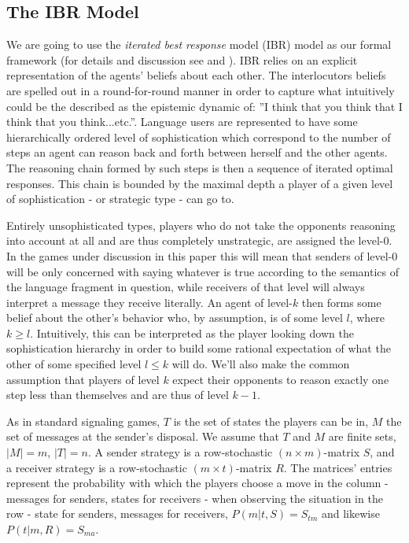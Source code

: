 \documentclass[10pt]{article}
\begin{document}
\subsection{The IBR Model}
We are going to use the \textit{iterated best response} model (IBR) model as our formal framework (for details and discussion see \cite{franke2009signal} and \cite{franke2014pragmatic}). IBR relies on an explicit representation of the agents' beliefs about each other. The interlocutors beliefs are spelled out in a round-for-round manner in order to capture what intuitively could be the described as the epistemic dynamic of: ''I think that you think that I think that you think...etc.''. Language users are represented to have some hierarchically ordered level of sophistication which correspond to the number of steps an agent can reason back and forth between herself and the other agents. The reasoning chain formed by such steps is then a sequence of iterated optimal responses. This chain is bounded by the maximal depth a player of a given level of sophistication - or strategic type - can go to.

Entirely unsophisticated types, players who do not take the opponents reasoning into account at all and are thus completely unstrategic, are assigned the level-0. In the games under discussion in this paper this will mean that senders of level-0 will be only concerned with saying whatever is true according to the semantics of the language fragment in question, while receivers of that level will always interpret a message they receive literally. An agent of level-$k$ then forms some belief about the other's behavior who, by assumption, is of some level $l$, where $k\geq l$. Intuitively, this can be interpreted as the player looking down the sophistication hierarchy in order to build some rational expectation of what the other of some specified level $l\leq k$ will do. We'll also make the common assumption that players of level $k$ expect their opponents to reason exactly one step less than themselves and are thus of level $k-1$.

As in standard signaling games, $T$ is the set of states the players can be in, $M$ the set of messages at the sender's disposal. We assume that $T$ and $M$ are finite sets, $|M|=m$, $|T|=n$. A sender strategy is a row-stochastic $(n \times m)$-matrix $S$, and a receiver strategy is a row-stochastic $(m\times t)$-matrix $R$.
The matrices' entries represent the probability with which the players choose a move in the column - messages for senders, states for receivers - when observing the situation in the row - state for senders, messages for receivers, $P(m|t,S) = S_{tm}$ and likewise $P(t|m,R) = S_{ma}$.
\end{document}

